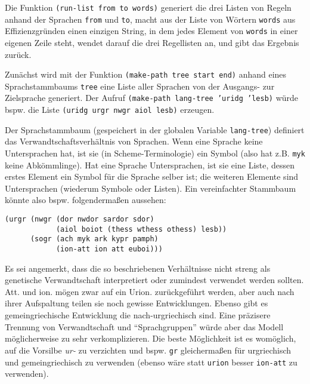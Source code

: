 \documentclass[12pt,a4paper,normalheadings]{scrartcl}
\def\tt#1{\texttt{#1}}
\begin{document}
Die Funktion \tt{(run-list from to words)}
generiert die drei Listen von Regeln anhand der Sprachen \tt{from} und \tt{to},
macht aus der Liste von Wörtern \tt{words} aus Effizienzgründen einen
einzigen String,
in dem jedes Element von \tt{words} in einer eigenen Zeile steht,
wendet darauf die drei Regellisten an,
und gibt das Ergebnis zurück.

Zunächst wird mit der Funktion \tt{(make-path tree start end)} anhand
eines Sprachstammbaums \tt{tree}
eine Liste aller Sprachen von der Ausgangs- zur Zielsprache generiert.
Der Aufruf \tt{(make-path lang-tree 'uridg 'lesb)} würde bspw.
die Liste \tt{(uridg urgr nwgr aiol lesb)} erzeugen.

Der Sprachstammbaum (gespeichert in der globalen Variable \tt{lang-tree})
definiert das Verwandtschaftsverhältnis von Sprachen.
Wenn eine Sprache keine Untersprachen hat,
ist sie (in Scheme-Terminologie) ein Symbol
(also hat z.B. \tt{myk} keine Abkömmlinge).
Hat eine Sprache Untersprachen,
ist sie eine Liste, dessen erstes Element ein Symbol für die Sprache selber ist;
die weiteren Elemente sind Untersprachen (wiederum Symbole oder Listen).
Ein vereinfachter Stammbaum könnte also bspw. folgendermaßen aussehen:
\begin{verbatim}
(urgr (nwgr (dor nwdor sardor sdor)
            (aiol boiot (thess wthess othess) lesb))
      (sogr (ach myk ark kypr pamph)
            (ion-att ion att euboi)))
\end{verbatim}
Es sei angemerkt,
dass die so beschriebenen Verhältnisse nicht streng als genetische
Verwandtschaft interpretiert oder zumindest verwendet werden sollten.
%
%
Att. und ion. mögen zwar auf ein Urion. zurückgeführt werden,
aber auch nach ihrer Aufspaltung teilen sie noch gewisse Entwicklungen.
Ebenso gibt es gemeingriechische Entwicklung die nach-urgriechisch sind.
Eine präzisere Trennung von Verwandtschaft und ``Sprachgruppen''
würde aber das Modell möglicherweise zu sehr verkomplizieren.
Die beste Möglichkeit ist es womöglich,
auf die Vorsilbe \textit{ur-} zu verzichten und bspw. \tt{gr}
gleichermaßen für urgriechisch und gemeingriechisch zu verwenden
(ebenso wäre statt \tt{urion} besser \tt{ion-att} zu verwenden).
%
%
\end{document}
